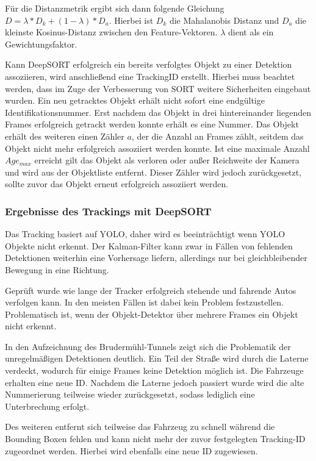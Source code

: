 \documentclass[conference]{IEEEtran}
\begin{document}
	Für die Distanzmetrik ergibt sich dann folgende Gleichung
	$D = \lambda * D_k + (1-\lambda) * D_a$. Hierbei ist $D_k$ die Mahalanobis Distanz und $D_a$ die kleinste Kosinus-Distanz zwischen den Feature-Vektoren. $\lambda$ dient als ein Gewichtungsfaktor.
	
	Kann DeepSORT erfolgreich ein bereits verfolgtes Objekt zu einer Detektion assoziieren, wird anschließend eine TrackingID erstellt. Hierbei muss beachtet werden, dass im Zuge der Verbesserung von SORT weitere Sicherheiten eingebaut wurden. Ein neu getracktes Objekt erhält nicht sofort eine endgültige Identifikationsnummer. Erst nachdem das Objekt in drei hintereinander liegenden Frames erfolgreich getrackt werden konnte erhält es eine Nummer. Das Objekt erhält des weiteren einen Zähler $a$, der die Anzahl an Frames zählt, seitdem das Objekt nicht mehr erfolgreich assoziiert werden konnte. Ist eine maximale Anzahl $Age_{max}$ erreicht gilt das Objekt als verloren oder außer Reichweite der Kamera und wird aus der Objektliste entfernt. Dieser Zähler wird jedoch zurückgesetzt, sollte zuvor das Objekt erneut erfolgreich assoziiert werden.
	
	\subsubsection{Ergebnisse des Trackings mit DeepSORT}
	Das Tracking basiert auf YOLO, daher wird es beeinträchtigt wenn YOLO Objekte nicht erkennt. Der Kalman-Filter kann zwar in Fällen von fehlenden Detektionen weiterhin eine Vorhersage liefern, allerdings nur bei gleichbleibender Bewegung in eine Richtung. 
	
	Geprüft wurde wie lange der Tracker erfolgreich stehende und fahrende Autos verfolgen kann. In den meisten Fällen ist dabei kein Problem festzustellen. Problematisch ist, wenn der Objekt-Detektor über mehrere Frames ein Objekt nicht erkennt.
	
	In den Aufzeichnung des Brudermühl-Tunnels zeigt sich die Problematik der
	unregelmäßigen Detektionen deutlich. Ein Teil der Straße wird durch die Laterne
	verdeckt, wodurch für einige Frames keine Detektion möglich ist. Die Fahrzeuge
	erhalten eine neue ID. Nachdem die Laterne jedoch passiert wurde wird die alte
	Nummerierung teilweise wieder zurückgesetzt, sodass lediglich eine Unterbrechung
	erfolgt.
	
	Des weiteren entfernt sich teilweise das Fahrzeug zu schnell während die Bounding Boxen fehlen und kann nicht
	mehr der zuvor festgelegten Tracking-ID zugeordnet werden. Hierbei wird ebenfalls eine neue ID zugewiesen.
	
\end{document}
